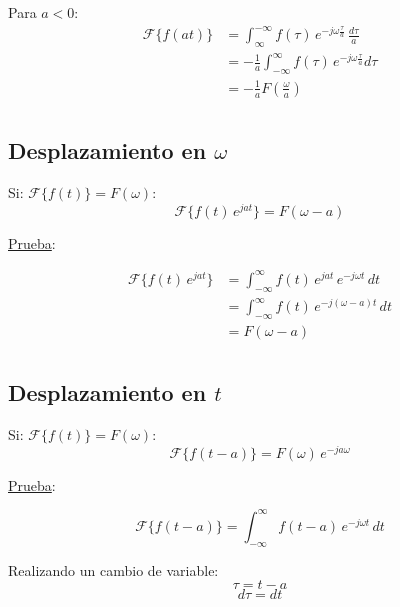 Para $a<0$:
\begin{equation*}
\begin{split}
    \mathcal{F}\{f(at)\}
        &=\int_\infty^{-\infty} f(\tau)\,e^{-j\omega
            \frac{\tau}{a}}\,\frac{d\tau}{a}\\
        &=-\frac{1}{a}\int_{-\infty}^\infty f(\tau)\,e^{-j\omega
            \frac{\tau}{a}}d\tau\\
        &=-\frac{1}{a}F\left(\frac{\omega}{a}\right)\\
\end{split}
\end{equation*}

\subsection{Desplazamiento en $\omega$}
Si: $\mathcal{F}\{f(t)\}=F(\omega)$:
\begin{equation}
    \mathcal{F}\{f(t)\,e^{jat}\}=F(\omega-a)
\end{equation}

\underline{Prueba}:

\begin{equation*}
\begin{split}
    \mathcal{F}\{f(t)\,e^{jat}\}
        &=\int_{-\infty}^\infty f(t)\,e^{jat}\,e^{-j\omega t}\,dt\\
        &=\int_{-\infty}^\infty f(t)\,e^{-j(\omega-a)t}\,dt\\
        &=F(\omega-a)\\
\end{split}
\end{equation*}

\subsection{Desplazamiento en $t$}
Si: $\mathcal{F}\{f(t)\}=F(\omega)$:
\begin{equation}
    \mathcal{F}\{f(t-a)\}=F(\omega)\,e^{-ja\omega}
\end{equation}

\underline{Prueba}:

\begin{equation*}
    \mathcal{F}\{f(t-a)\}=\int_{-\infty}^\infty f(t-a)\,e^{-j\omega t}\,dt
\end{equation*}

Realizando un cambio de variable:
\begin{equation*}
    \tau=t-a
\end{equation*}
\begin{equation*}
    d\tau=dt
\end{equation*}

